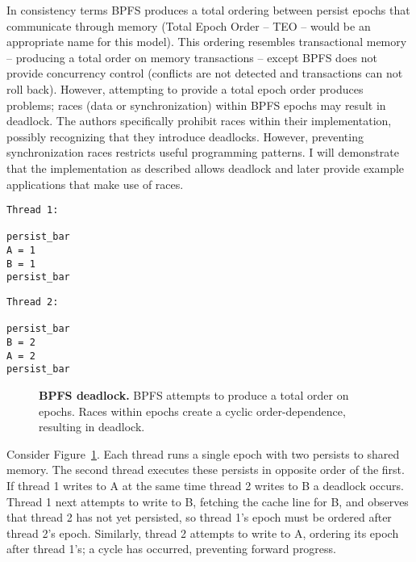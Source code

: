 In consistency terms BPFS produces a total ordering between persist epochs that communicate through memory (Total Epoch Order -- TEO -- would be an appropriate name for this model).
This ordering resembles transactional memory -- producing a total order on memory transactions -- except BPFS does not provide concurrency control (conflicts are not detected and transactions can not roll back).
However, attempting to provide a total epoch order produces problems; races (data or synchronization) within BPFS epochs may result in deadlock.
The authors specifically prohibit races within their implementation, possibly recognizing that they introduce deadlocks.
However, preventing synchronization races restricts useful programming patterns.
I will demonstrate that the implementation as described allows deadlock and later provide example applications that make use of races.

{
\singlespacing
\newsavebox{\ThreadOne}
\begin{lrbox}{\ThreadOne}
  \begin{lstlisting}
Thread 1:

persist_bar
A = 1
B = 1
persist_bar
  \end{lstlisting}
\end{lrbox}

\newsavebox{\ThreadTwo}
\begin{lrbox}{\ThreadTwo}
  \begin{lstlisting}
Thread 2:

persist_bar
B = 2
A = 2
persist_bar
  \end{lstlisting}
\end{lrbox}

\begin{figure}[]
\centering
\subfigure{ \usebox{\ThreadOne} }
\hspace{1 in}
\subfigure{ \usebox{\ThreadTwo} }
\caption{\textbf{BPFS deadlock.} BPFS attempts to produce a total order on epochs.  Races within epochs create a cyclic order-dependence, resulting in deadlock.}
\label{fig:BPFS_deadlock}
\end{figure}
}

Consider Figure~\ref{fig:BPFS_deadlock}.
Each thread runs a single epoch with two persists to shared memory.
The second thread executes these persists in opposite order of the first.
If thread 1 writes to A at the same time thread 2 writes to B a deadlock occurs.
Thread 1 next attempts to write to B, fetching the cache line for B, and observes that thread 2 has not yet persisted, so thread 1's epoch must be ordered after thread 2's epoch.
Similarly, thread 2 attempts to write to A, ordering its epoch after thread 1's; a cycle has occurred, preventing forward progress.

